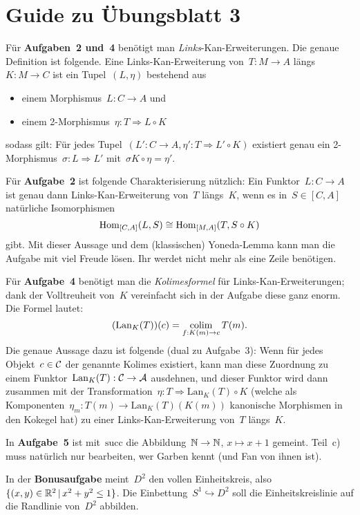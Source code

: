 \documentclass{uebblatt}
\begin{document}
\section*{Guide zu Übungsblatt 3}

Für \textbf{Aufgaben~2 und~4} benötigt man \emph{Links}-Kan-Erweiterungen. Die genaue
Definition ist folgende. Eine Links-Kan-Erweiterung von~$T : M \to A$ längs~$K
: M \to C$ ist ein Tupel~$(L,\eta)$ bestehend aus
\begin{itemize}
\item einem Morphismus~$L : C \to A$ und
\item einem 2-Morphismus~$\eta : T \Rightarrow L \circ K$
\end{itemize}
sodass gilt:
Für jedes Tupel~$(L' : C \to A,\eta' : T \Rightarrow L' \circ K)$ existiert
genau ein 2-Morphismus~$\sigma : L \Rightarrow L'$ mit~$
\sigma K \circ \eta = \eta'$.

Für \textbf{Aufgabe~2} ist folgende Charakterisierung nützlich: Ein Funktor~$L : C \to
A$ ist genau dann Links-Kan-Erweiterung von~$T$ längs~$K$, wenn es in~$S \in
[C,A]$ natürliche Isomorphismen
\[ \mathrm{Hom}_{[C,A]}(L, S) \cong \mathrm{Hom}_{[M,A]}(T, S \circ K) \]
gibt. Mit dieser Aussage und dem (klassischen) Yoneda-Lemma kann man
die Aufgabe mit viel Freude lösen. Ihr werdet nicht mehr als eine Zeile
benötigen.

Für \textbf{Aufgabe~4} benötigt man die \emph{Kolimesformel} für
Links-Kan-Erweiterungen; dank der Volltreuheit von~$K$ vereinfacht sich in der
Aufgabe diese ganz enorm. Die Formel lautet:
\[ (\mathrm{Lan}_K(T))(c) = \operatorname*{colim}_{f:K(m) \to c} T(m). \]
Die genaue Aussage dazu ist folgende (dual zu Aufgabe~3): Wenn für jedes
Objekt~$c \in \mathcal{C}$ der genannte Kolimes existiert, kann man diese Zuordnung zu
einem Funktor~$\mathrm{Lan}_K(T) : \mathcal{C} \to \mathcal{A}$ ausdehnen, und dieser Funktor
wird dann zusammen mit der Transformation~$\eta : T \Rightarrow \mathrm{Lan}_K(T)
\circ K$ (welche als Komponenten~$\eta_m : T(m) \to \mathrm{Lan}_K(T)(K(m))$
kanonische Morphismen in den Kokegel hat) zu einer Links-Kan-Erweiterung
von~$T$ längs~$K$.

In \textbf{Aufgabe~5} ist mit~$\mathrm{succ}$ die Abbildung~$\mathbb{N} \to \mathbb{N}$, $x \mapsto x
+ 1$ gemeint. Teil~c) muss natürlich nur bearbeiten, wer Garben kennt (und Fan
von ihnen ist).

In der \textbf{Bonusaufgabe} meint~$D^2$ den vollen Einheitskreis, also~$\{ (x,y) \in
\mathbb{R}^2 \,|\, x^2 + y^2 \leq 1 \}$. Die Einbettung~$S^1 \hookrightarrow D^2$ soll
die Einheitskreislinie auf die Randlinie von~$D^2$ abbilden.
\end{document}
